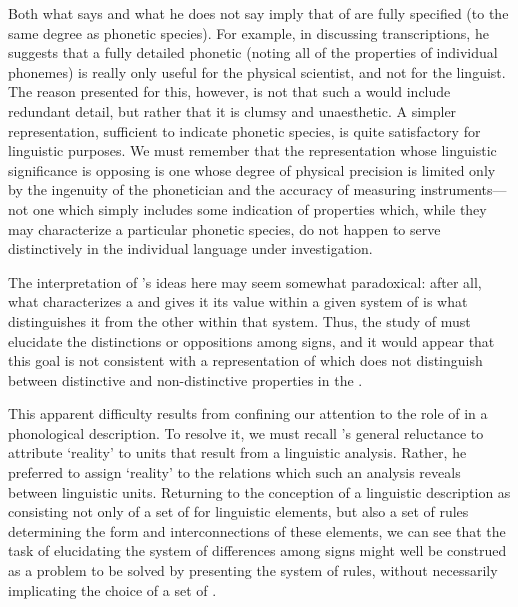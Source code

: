 Both what {\Saussure} says and what he does not say imply that
 of \emph{} are fully specified (to the same
degree as phonetic species). For example, in discussing
transcriptions, he suggests that a fully detailed phonetic
 (noting all of the properties of individual phonemes) is
really only useful for the physical scientist, and not for the
linguist. The reason presented for this, however, is not that such a
 would include redundant detail, but rather that it is
clumsy and unaesthetic. A simpler representation, sufficient to
indicate phonetic species, is quite satisfactory for linguistic
purposes. We must remember that the representation whose linguistic
significance {\Saussure} is opposing is one whose degree of physical
precision is limited only by the ingenuity of the phonetician and the
accuracy of measuring instruments—not one which simply includes some
indication of properties which, while they may characterize a
particular phonetic species, do not happen to serve distinctively in
the individual language under investigation.

The interpretation of {\Saussure}'s ideas here may seem somewhat
paradoxical: after all, what characterizes a \emph{} and
gives it its value within a given system of \emph{} is what
distinguishes it from the other \emph{} within that
system. Thus, the study of \emph{} must elucidate the
distinctions or {oppositions} among signs, and it would appear that this
goal is not consistent with a representation of \emph{}
which does not distinguish between distinctive and non-distinctive
properties in the .

This apparent difficulty results from confining our attention to the
role of  in a phonological description. To resolve it,
we must recall {\Saussure}'s general reluctance to attribute `reality' to
units that result from a linguistic analysis. Rather, he preferred to
assign `reality' to the relations which such an analysis reveals
between linguistic units. Returning to the conception of a linguistic
description as consisting not only of a set of  for
linguistic elements, but also a set of {rules} determining the form and
interconnections of these elements, we can see that the task of
elucidating the system of differences among signs might well be
construed as a problem to be solved by presenting the system of {rules},
without necessarily implicating the choice of a set of .

